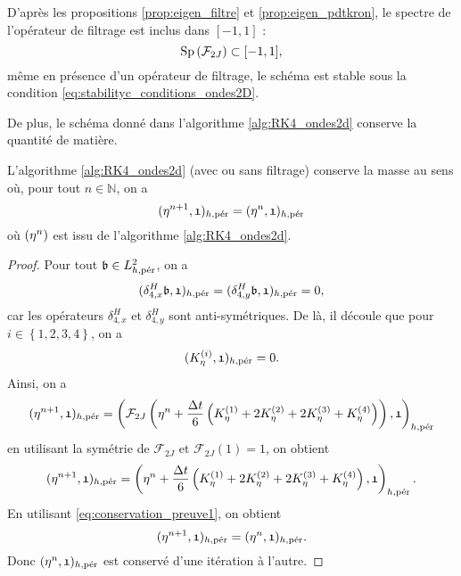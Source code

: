 D'après les propositions \ref{prop:eigen_filtre} et \ref{prop:eigen_pdtkron}, le spectre de l'opérateur de filtrage est inclus dans $[-1,1]$ :
\begin{equation}
\Sp \left( \mathcal{F}_{2J} \right) \subset [-1,1],
\end{equation}
même en présence d'un opérateur de filtrage, le schéma est stable sous la condition \eqref{eq:stabilityc_conditions_ondes2D}.


De plus, le schéma donné dans l'algorithme \ref{alg:RK4_ondes2d} conserve la quantité de matière.
\begin{proposition}
L'algorithme \ref{alg:RK4_ondes2d} (avec ou sans filtrage) conserve la masse au sens où, pour tout $n \in \mathbb{N}$, on a 
\begin{equation}
(\etafrak^{n+1} , \mathfrak{1})_{h,\per} = (\etafrak^{n} , \mathfrak{1})_{h,\per}
\end{equation}
où $(\etafrak^n)$ est issu de l'algorithme \ref{alg:RK4_ondes2d}.
\end{proposition}

\begin{proof}
Pour tout $\mathfrak{b} \in L^2_{h,\per}$, on a 
\begin{equation}
(\delta_{4,x}^H \mathfrak{b}, \mathfrak{1})_{h,\per} = (\delta_{4,y}^H \mathfrak{b}, \mathfrak{1})_{h,\per} = 0,
\end{equation}
car les opérateurs $\delta_{4,x}^H$ et $\delta_{4,y}^H$ sont anti-symétriques. De là, il découle que pour $i \in \left\lbrace 1,2,3,4 \right\rbrace$, on a 
\begin{equation}
(K_{\eta}^{(i)}, \mathfrak{1})_{h,\per} = 0.
\label{eq:conservation_preuve1}
\end{equation}
Ainsi, on a
\begin{equation}
(\etafrak^{n+1}, \mathfrak{1})_{h,\per} = \left( \mathcal{F}_{2J}\left( \etafrak^n  + \dfrac{\Delta t}{6} \left( K^{(1)}_{\eta} + 2 K^{(2)}_{\eta} + 2 K^{(3)}_{\eta} + K^{(4)}_{\eta} \right) \right) , \mathfrak{1} \right)_{h,\per}
\end{equation}
en utilisant la symétrie de $\mathcal{F}_{2J}$ et $\mathcal{F}_{2J}(\mathfrak{1}) = \mathfrak{1}$, on obtient
\begin{equation}
(\etafrak^{n+1}, \mathfrak{1})_{h,\per} = \left( \etafrak^n  + \dfrac{\Delta t}{6} \left( K^{(1)}_{\eta} + 2 K^{(2)}_{\eta} + 2 K^{(3)}_{\eta} + K^{(4)}_{\eta} \right) , \mathfrak{1}\right)_{h,\per}.
\end{equation}
En utilisant \eqref{eq:conservation_preuve1}, on obtient
\begin{equation}
(\etafrak^{n+1} , \mathfrak{1})_{h,\per} = (\etafrak^{n} , \mathfrak{1})_{h,\per}.
\end{equation}
Donc $(\etafrak^n,\mathfrak{1})_{h,\per}$ est conservé d'une itération à l'autre.
\end{proof}









